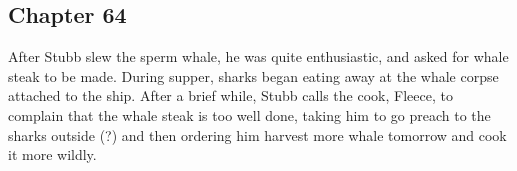 \subsection{Chapter 64}

After Stubb slew the sperm whale, he was quite enthusiastic, and asked for
whale steak to be made. During supper, sharks began eating away at the whale
corpse attached to the ship. After a brief while, Stubb calls the cook, Fleece,
to complain that the whale steak is too well done, taking him to go preach to
the sharks outside (?) and then ordering him harvest more whale tomorrow and
cook it more wildly.
